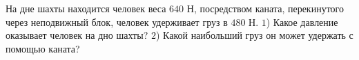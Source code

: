 На дне шахты находится человек веса $640$ Н, посредством каната,
перекинутого через неподвижный блок, человек удерживает груз в $480$ Н.
$1$) Какое давление оказывает человек на дно шахты? $2$) Какой наибольший
груз он может удержать с помощью каната?

